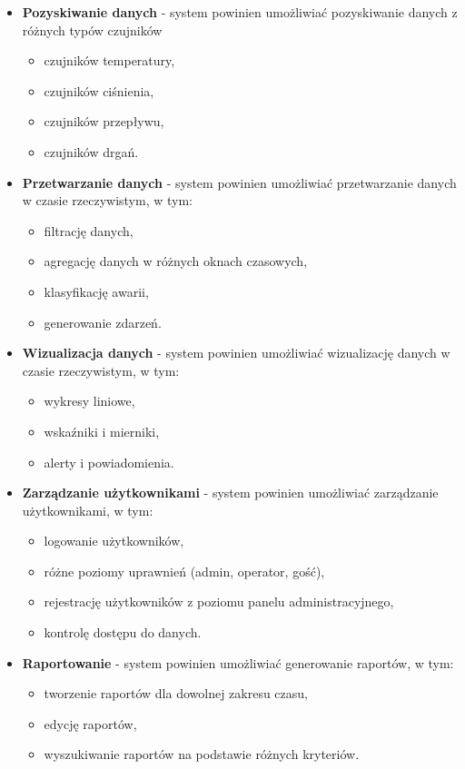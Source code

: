 \begin{itemize}
    \item \textbf{Pozyskiwanie danych} - system powinien umożliwiać pozyskiwanie danych z różnych typów czujników
   \begin{itemize}
       \item czujników temperatury,
       \item czujników ciśnienia,
       \item czujników przepływu,
       \item czujników drgań.
   \end{itemize}
    
    \item \textbf{Przetwarzanie danych} - system powinien umożliwiać przetwarzanie danych w czasie rzeczywistym, w tym:
    \begin{itemize}
        \item filtrację danych,
        \item agregację danych w różnych oknach czasowych,
        \item klasyfikację awarii,
        \item generowanie zdarzeń.
    \end{itemize}
    
    \item \textbf{Wizualizacja danych} - system powinien umożliwiać wizualizację danych w czasie rzeczywistym, w tym:
    \begin{itemize}
        \item wykresy liniowe,
        \item wskaźniki i mierniki,
        \item alerty i powiadomienia.
    \end{itemize}
    
   \item \textbf{Zarządzanie użytkownikami} - system powinien umożliwiać zarządzanie użytkownikami, w tym:
   \begin{itemize}
       \item logowanie użytkowników,
       \item różne poziomy uprawnień (admin, operator, gość),
       \item rejestrację użytkowników z poziomu panelu administracyjnego,
       \item kontrolę dostępu do danych.
   \end{itemize}
    
    \item \textbf{Raportowanie} - system powinien umożliwiać generowanie raportów, w tym:
   \begin{itemize}
       \item tworzenie raportów dla dowolnej zakresu czasu,
       \item edycję raportów,
       \item wyszukiwanie raportów na podstawie różnych kryteriów.
   \end{itemize}
\end{itemize}

